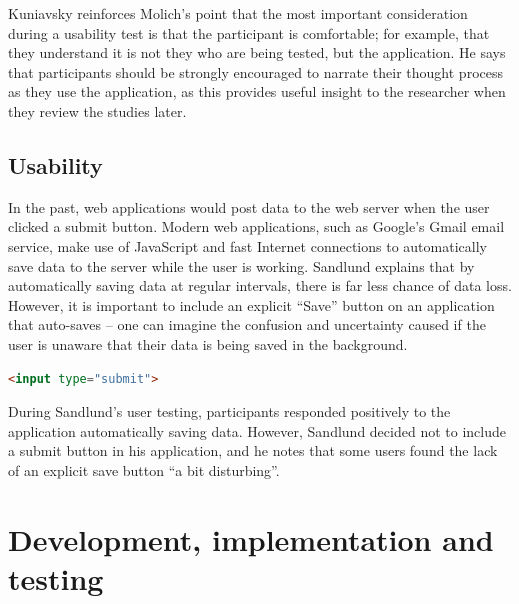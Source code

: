 \documentclass[draft]{scrartcl}
\let\stdsection\section
\renewcommand\section{\clearpage\stdsection}
\begin{document}
Kuniavsky reinforces Molich's point that the most important consideration
during a usability test is that the participant is comfortable; for example,
that they understand it is not they who are being tested, but the application.
He says that participants should be strongly encouraged to narrate their
thought process as they use the application, as this provides useful insight
to the researcher when they review the studies later.

\subsection{Usability}


In the past, web applications would \gls{post} data to the web server when the
user clicked a submit button. Modern web applications, such as Google's Gmail
email service, make use of JavaScript and fast Internet connections to
automatically save data to the server while the user is working. Sandlund
\cite{sandlund2009websoftware} explains that by automatically saving data at
regular intervals, there is far less chance of data loss. However, it is
important to include an explicit ``Save'' button on an application that
auto-saves -- one can imagine the confusion and uncertainty caused if the user
is unaware that their data is being saved in the background.

\begin{lstlisting}[language=HTML]
<input type="submit">
\end{lstlisting}

During Sandlund's user testing, participants responded positively to the
application automatically saving data. However, Sandlund decided not to
include a submit button in his application, and he notes that some users found
the lack of an explicit save button ``a bit disturbing''.



% 

\section{Development, implementation and testing}
\label{sec:implementation}
\end{document}
